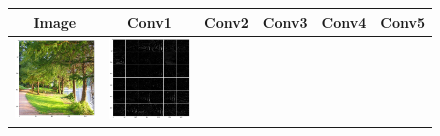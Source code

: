 \begin{figure}[!htb]
\begin{center}

\begin{tabular}{|c|c|c|c|c|c|} \hline\hline
Image & Conv1 & Conv2 & Conv3 & Conv4 & Conv5  \\ \hline
\includegraphics[scale=0.1]{sunny2.png} &
\includegraphics[scale=0.1]{sunny2_caffe_conv1_fm.png} &

\end{tabular}
\end{center}
\end{figure}

